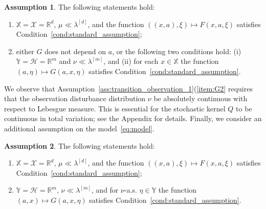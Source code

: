\documentclass[11pt,onecolumn]{IEEEtran}  %
\newcommand{\Rb}{\mathbb{R}}
\newcommand{\Xb}{\mathbb{X}}
\newcommand{\Yb}{\mathbb{Y}}
\newcommand{\Xc}{\mathcal{X}}
\newcommand{\Hc}{\mathcal{H}}
\theoremstyle{definition}
\newtheorem{assumption}{Assumption}
\begin{document}
\begin{assumption} \label{ass:transition_observation_2}
    The following statements hold:
    \begin{enumerate}[label=\alph*)]
        \item \label{item:F2} $\Xb=\Xc=\Rb^d$, $\mu \ll \lambda^{[d]}$, and the function $((x,a),\xi) \mapsto F(x,a,\xi)$ satisfies Condition~\ref{cond:standard_assumption};
        \item \label{item:G2} either $G$ does not depend on $a$, or the following two conditions hold: (i) $\Yb=\Hc=\Rb^m$ and $\nu \ll \lambda^{[m]}$, and (ii) for each $x \in \Xb$ the function $(a,\eta) \mapsto G(a,x,\eta)$ satisfies Condition~\ref{cond:standard_assumption}.
    \end{enumerate}
\end{assumption}


We observe that Assumption~\ref{ass:transition_observation_1}(\ref{item:G2} requires that the observation disturbance distribution $\nu$ be absolutely continuous with respect to Lebesgue measure. This is essential for the stochastic kernel $Q$ to be continuous in total variation; see the Appendix for details. Finally, we consider an additional assumption on the model~\eqref{eq:model}.

\begin{assumption} \label{ass:SUF}
    The following statements hold:
    \begin{enumerate}[label=\alph*)]
        \item \label{item:F3} $\Xb=\Xc=\Rb^d$, $\mu \ll \lambda^{[d]}$, and the function $((x,a),\xi) \mapsto F(x,a,\xi)$ satisfies Condition~\ref{cond:standard_assumption};
        \item \label{item:G3} $\Yb=\Hc=\Rb^m$, $\nu \ll \lambda^{[m]}$, and for $\nu$-a.s. $\eta \in \Yb$ the function $(a,x) \mapsto G(a,x,\eta)$ satisfies Condition~\ref{cond:standard_assumption}.
    \end{enumerate}
\end{assumption}
\end{document}

